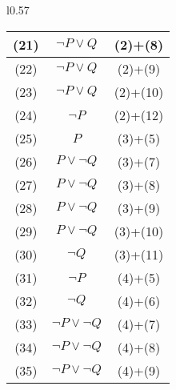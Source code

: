 \documentclass[18pt, a4paper]{extarticle}
\begin{document}
\begin{wrapfigure}[15]{l}{0.57\textwidth}
{\begin{tabular}{ccc}
\multicolumn{1}{|c|}{\cellcolor[HTML]{34CDF9}(21)} & \multicolumn{1}{c|}{$\lnot P\vee Q$}      & \multicolumn{1}{c|}{(2)+(8)}  \\ \hline
\multicolumn{1}{|c|}{\cellcolor[HTML]{34CDF9}(22)} & \multicolumn{1}{c|}{$\lnot P\vee Q$}      & \multicolumn{1}{c|}{(2)+(9)}  \\ \hline
\multicolumn{1}{|c|}{\cellcolor[HTML]{34CDF9}(23)} & \multicolumn{1}{c|}{$\lnot P\vee Q$}      & \multicolumn{1}{c|}{(2)+(10)} \\ \hline
\multicolumn{1}{|c|}{\cellcolor[HTML]{34CDF9}(24)} & \multicolumn{1}{c|}{$\lnot P$}            & \multicolumn{1}{c|}{(2)+(12)} \\ \hline
\multicolumn{1}{|c|}{\cellcolor[HTML]{34CDF9}(25)} & \multicolumn{1}{c|}{$P$}                  & \multicolumn{1}{c|}{(3)+(5)}  \\ \hline
\multicolumn{1}{|c|}{\cellcolor[HTML]{34CDF9}(26)} & \multicolumn{1}{c|}{$ P\vee\lnot Q$}      & \multicolumn{1}{c|}{(3)+(7)}  \\ \hline
\multicolumn{1}{|c|}{\cellcolor[HTML]{34CDF9}(27)} & \multicolumn{1}{c|}{$ P\vee\lnot Q$}      & \multicolumn{1}{c|}{(3)+(8)}  \\ \hline
\multicolumn{1}{|c|}{\cellcolor[HTML]{34CDF9}(28)} & \multicolumn{1}{c|}{$ P\vee\lnot Q$}      & \multicolumn{1}{c|}{(3)+(9)}  \\ \hline
\multicolumn{1}{|c|}{\cellcolor[HTML]{34CDF9}(29)} & \multicolumn{1}{c|}{$ P\vee\lnot Q$}      & \multicolumn{1}{c|}{(3)+(10)} \\ \hline
\multicolumn{1}{|c|}{\cellcolor[HTML]{34CDF9}(30)} & \multicolumn{1}{c|}{$\lnot Q$}            & \multicolumn{1}{c|}{(3)+(11)} \\ \hline
\multicolumn{1}{|c|}{\cellcolor[HTML]{34CDF9}(31)} & \multicolumn{1}{c|}{$\lnot P$}            & \multicolumn{1}{c|}{(4)+(5)}  \\ \hline
\multicolumn{1}{|c|}{\cellcolor[HTML]{34CDF9}(32)} & \multicolumn{1}{c|}{$\lnot Q$}            & \multicolumn{1}{c|}{(4)+(6)}  \\ \hline
\multicolumn{1}{|c|}{\cellcolor[HTML]{34CDF9}(33)} & \multicolumn{1}{c|}{$\lnot P\vee\lnot Q$} & \multicolumn{1}{c|}{(4)+(7)}  \\ \hline
\multicolumn{1}{|c|}{\cellcolor[HTML]{34CDF9}(34)} & \multicolumn{1}{c|}{$\lnot P\vee\lnot Q$} & \multicolumn{1}{c|}{(4)+(8)}  \\ \hline
\multicolumn{1}{|c|}{\cellcolor[HTML]{34CDF9}(35)} & \multicolumn{1}{c|}{$\lnot P\vee\lnot Q$} & \multicolumn{1}{c|}{(4)+(9)}  \\ \hline

\end{tabular}}
\end{wrapfigure}
\end{document}
